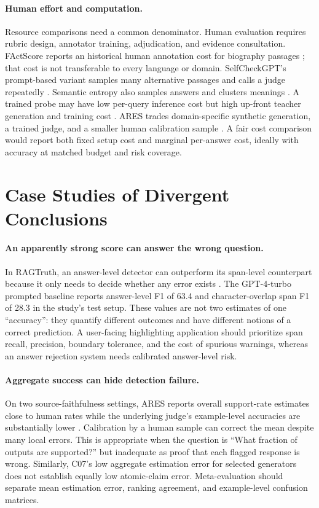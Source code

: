 \documentclass[11pt]{article}
\begin{document}
\paragraph{Human effort and computation.} Resource comparisons need a common denominator. Human evaluation requires rubric design, annotator training, adjudication, and evidence consultation. FActScore reports an historical human annotation cost for biography passages \citep{C07}; that cost is not transferable to every language or domain. SelfCheckGPT's prompt-based variant samples many alternative passages and calls a judge repeatedly \citep{C08}. Semantic entropy also samples answers and clusters meanings \citep{C10}. A trained probe may have low per-query inference cost but high up-front teacher generation and training cost \citep{I090}. ARES trades domain-specific synthetic generation, a trained judge, and a smaller human calibration sample \citep{I044}. A fair cost comparison would report both fixed setup cost and marginal per-answer cost, ideally with accuracy at matched budget and risk coverage.

\section{Case Studies of Divergent Conclusions}
\paragraph{An apparently strong score can answer the wrong question.} In RAGTruth, an answer-level detector can outperform its span-level counterpart because it only needs to decide whether any error exists \citep{C12}. The GPT-4-turbo prompted baseline reports answer-level F1 of 63.4 and character-overlap span F1 of 28.3 in the study's test setup. These values are not two estimates of one ``accuracy'': they quantify different outcomes and have different notions of a correct prediction. A user-facing highlighting application should prioritize span recall, precision, boundary tolerance, and the cost of spurious warnings, whereas an answer rejection system needs calibrated answer-level risk.

\paragraph{Aggregate success can hide detection failure.} On two source-faithfulness settings, ARES reports overall support-rate estimates close to human rates while the underlying judge's example-level accuracies are substantially lower \citep{I044}. Calibration by a human sample can correct the mean despite many local errors. This is appropriate when the question is ``What fraction of outputs are supported?'' but inadequate as proof that each flagged response is wrong. Similarly, C07's low aggregate estimation error for selected generators does not establish equally low atomic-claim error. Meta-evaluation should separate mean estimation error, ranking agreement, and example-level confusion matrices.
\end{document}
